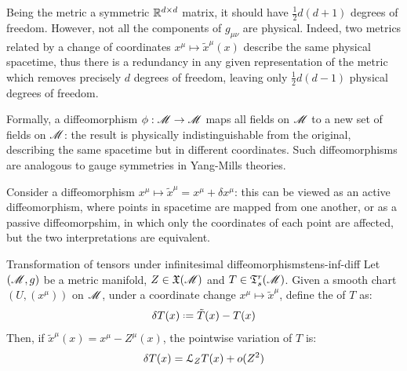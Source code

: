 Being the metric a symmetric $ \mathbb{R}^{d \times d} $ matrix, it should have $ \frac{1}{2} d (d+1) $ degrees of freedom. However, not all the components of $ g_{\mu \nu} $ are physical. Indeed, two metrics related by a change of coordinates $ x^\mu \mapsto \tilde{x}^\mu(x) $ describe the same physical spacetime, thus there is a redundancy in any given representation of the metric which removes precisely $ d $ degrees of freedom, leaving only $ \frac{1}{2} d (d-1) $ physical degrees of freedom.

Formally, a diffeomorphism $ \phi : \mathscr{M} \rightarrow \mathscr{M} $ maps all fields on $ \mathscr{M} $ to a new set of fields on $ \mathscr{M} $: the result is physically indistinguishable from the original, describing the same spacetime but in different coordinates. Such diffeomorphisms are analogous to gauge symmetries in Yang-Mills theories.

Consider a diffeomorphism $ x^\mu \mapsto \tilde{x}^\mu = x^\mu + \delta x^\mu $: this can be viewed as an active diffeomorphism, where points in spacetime are mapped from one another, or as a passive diffeomorpshim, in which only the coordinates of each point are affected, but the two interpretations are equivalent.

\begin{lemma}{Transformation of tensors under infinitesimal diffeomorphisms}{tens-inf-diff}
  Let $ (\mathscr{M},g) $ be a metric manifold, $ Z \in \mathfrak{X}(\mathscr{M}) $ and $ T \in \mathfrak{T}^{r}_{s}(\mathscr{M}) $. Given a smooth chart $ (U,(x^\mu)) $ on $ \mathscr{M} $, under a coordinate change $ x^\mu \mapsto \tilde{x}^\mu $, define the  of $ T $ as:
  \begin{equation}
    \delta T(x) \defeq \tilde{T}(x) - T(x)
  \end{equation}
  Then, if $ \tilde{x}^\mu(x) = x^\mu - Z^\mu(x) $, the pointwise variation of $ T $ is:
  \begin{equation}
     \delta T(x) = \EuScript{L}_Z T(x) + o(Z^2)
  \end{equation}
\end{lemma}

